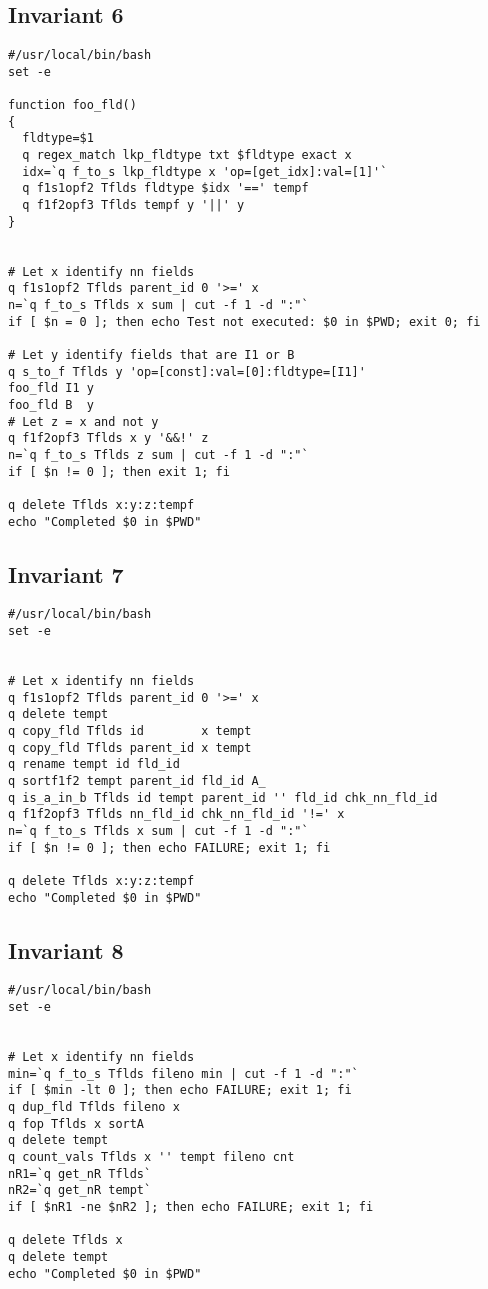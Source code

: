 \documentclass{report}
\begin{document}
\subsection{Invariant 6}
\label{code_6} 
\begin{verbatim}
#/usr/local/bin/bash
set -e 

function foo_fld()
{
  fldtype=$1
  q regex_match lkp_fldtype txt $fldtype exact x
  idx=`q f_to_s lkp_fldtype x 'op=[get_idx]:val=[1]'`
  q f1s1opf2 Tflds fldtype $idx '==' tempf
  q f1f2opf3 Tflds tempf y '||' y
}


# Let x identify nn fields 
q f1s1opf2 Tflds parent_id 0 '>=' x
n=`q f_to_s Tflds x sum | cut -f 1 -d ":"`
if [ $n = 0 ]; then echo Test not executed: $0 in $PWD; exit 0; fi

# Let y identify fields that are I1 or B
q s_to_f Tflds y 'op=[const]:val=[0]:fldtype=[I1]'
foo_fld I1 y
foo_fld B  y
# Let z = x and not y
q f1f2opf3 Tflds x y '&&!' z
n=`q f_to_s Tflds z sum | cut -f 1 -d ":"`
if [ $n != 0 ]; then exit 1; fi 

q delete Tflds x:y:z:tempf
echo "Completed $0 in $PWD"
\end{verbatim}
\subsection{Invariant 7}
\label{code_7} 
\begin{verbatim}
#/usr/local/bin/bash
set -e 


# Let x identify nn fields 
q f1s1opf2 Tflds parent_id 0 '>=' x
q delete tempt
q copy_fld Tflds id        x tempt 
q copy_fld Tflds parent_id x tempt 
q rename tempt id fld_id 
q sortf1f2 tempt parent_id fld_id A_
q is_a_in_b Tflds id tempt parent_id '' fld_id chk_nn_fld_id
q f1f2opf3 Tflds nn_fld_id chk_nn_fld_id '!=' x
n=`q f_to_s Tflds x sum | cut -f 1 -d ":"`
if [ $n != 0 ]; then echo FAILURE; exit 1; fi

q delete Tflds x:y:z:tempf
echo "Completed $0 in $PWD"
\end{verbatim}
\subsection{Invariant 8}
\label{code_8} 
\begin{verbatim}
#/usr/local/bin/bash
set -e 


# Let x identify nn fields 
min=`q f_to_s Tflds fileno min | cut -f 1 -d ":"`
if [ $min -lt 0 ]; then echo FAILURE; exit 1; fi 
q dup_fld Tflds fileno x
q fop Tflds x sortA
q delete tempt
q count_vals Tflds x '' tempt fileno cnt
nR1=`q get_nR Tflds`
nR2=`q get_nR tempt`
if [ $nR1 -ne $nR2 ]; then echo FAILURE; exit 1; fi 

q delete Tflds x
q delete tempt
echo "Completed $0 in $PWD"
\end{verbatim}
\end{document}
